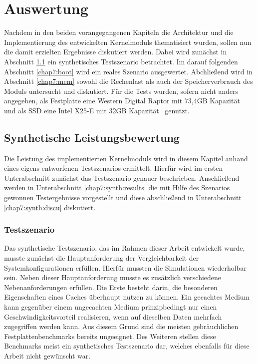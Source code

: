 \chapter{Auswertung}
\label{chap7}

Nachdem in den beiden vorangegangenen Kapiteln die Architektur und die Implementierung des entwickelten Kernelmoduls thematisiert wurden, sollen nun die damit
erzielten Ergebnisse diskutiert werden. Dabei wird zunächst in Abschnitt \ref{chap7:synth} ein synthetisches Testszenario betrachtet. Im darauf folgenden
Abschnitt \ref{chap7:boot} wird ein reales Szenario ausgewertet. Abchließend wird in Abschnitt \ref{chap7:mem} sowohl die Rechenlast als auch der
Speicherverbrauch des Moduls untersucht und diskutiert. Für die Tests wurden, sofern nicht anders angegeben, als Festplatte eine Western Digital Raptor
mit 73,4GB Kapazität~\cite{wd:raptor} und als SSD eine Intel X25-E mit 32GB Kapazität~\cite{intel:ssd} genutzt.

\section{Synthetische Leistungsbewertung}
\label{chap7:synth}

Die Leistung des implementierten Kernelmoduls wird in diesem Kapitel anhand eines eigens entworfenen Testszenarios ermittelt. Hierfür wird im ersten
Unterabschnitt zunächst das Testszenario genauer beschrieben. Anschließend werden in Unterabschnitt \ref{chap7:synth:results} die mit Hilfe des Szenarios
gewonnen Testergebnisse vorgestellt und diese abschließend in Unterabschnitt \ref{chap7:synth:discu} diskutiert.

\subsection{Testszenario}
\label{chap7:synth:szenario}

Das synthetische Testszenario, das im Rahmen dieser Arbeit entwickelt wurde, musste zunächst die Hauptanforderung der Vergleichbarkeit der Systemkonfigurationen
erfüllen. Hierfür mussten die Simulationen wiederholbar sein. Neben dieser Hauptanforderung musste es zusätzlich verschiedene Nebenanforderungen erfüllen. Die
Erste besteht darin, die besonderen Eigenschaften eines Caches überhaupt nutzen zu können. Ein gecachtes Medium kann gegenüber einem ungecachten Medium
prinzipbedingt nur einen Geschwindigkeitsvorteil realisieren, wenn auf dieselben Daten mehrfach zugegriffen werden kann. Aus diesem Grund sind die meisten
gebräuchlichen Festplattenbenchmarks bereits ungeeignet. Des Weiteren stellen diese Benchmarks meist ein synthetisches Testszenario dar, welches ebenfalls für
diese Arbeit nicht gewünscht war.

